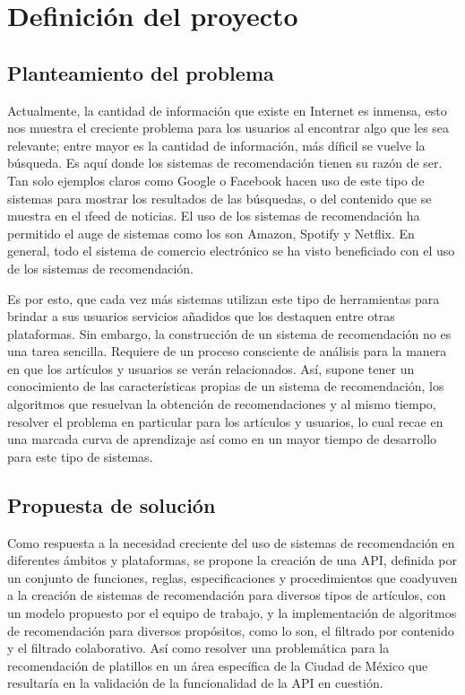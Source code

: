 \chapter {Definición del proyecto}
  \section{Planteamiento del problema}
    Actualmente, la cantidad de información que existe en Internet es inmensa, esto nos muestra el creciente problema para los usuarios al encontrar algo que les sea relevante; entre mayor es la cantidad de información, más díficil se vuelve la búsqueda. Es aquí donde los sistemas de recomendación tienen su razón de ser. Tan solo ejemplos claros como Google o Facebook hacen uso de este tipo de sistemas para mostrar los resultados de las búsquedas, o del contenido que se muestra en el \i{feed} de noticias. El uso de los sistemas de recomendación ha permitido el auge de sistemas como los son Amazon, Spotify y Netflix. En general, todo el sistema de comercio electrónico se ha visto beneficiado con el uso de los sistemas de recomendación. 

    Es por esto, que cada vez más sistemas utilizan este tipo de herramientas para brindar a sus usuarios servicios añadidos que los destaquen entre otras plataformas. Sin embargo, la construcción de un sistema de recomendación no es una tarea sencilla. Requiere de un proceso consciente de análisis para la manera en que los artículos y usuarios se verán relacionados. Así, supone tener un conocimiento de las características propias de un sistema de recomendación, los algoritmos que resuelvan la obtención de recomendaciones y al mismo tiempo, resolver el problema en particular para los artículos y usuarios, lo cual recae en una marcada curva de aprendizaje así como en un mayor tiempo de desarrollo para este tipo de sistemas.

  \section{Propuesta de solución}
    Como respuesta a la necesidad creciente del uso de sistemas de recomendación en diferentes ámbitos y plataformas, se propone la creación de una API, definida por un conjunto de funciones, reglas, especificaciones y procedimientos que coadyuven a la creación de sistemas de recomendación para diversos tipos de artículos, con un modelo propuesto por el equipo de trabajo, y la implementación de algoritmos de recomendación para diversos propósitos, como lo son, el filtrado por contenido y el filtrado colaborativo. Así como resolver una problemática para la recomendación de platillos en un área específica de la Ciudad de México que resultaría en la validación de la funcionalidad de la API en cuestión. 

